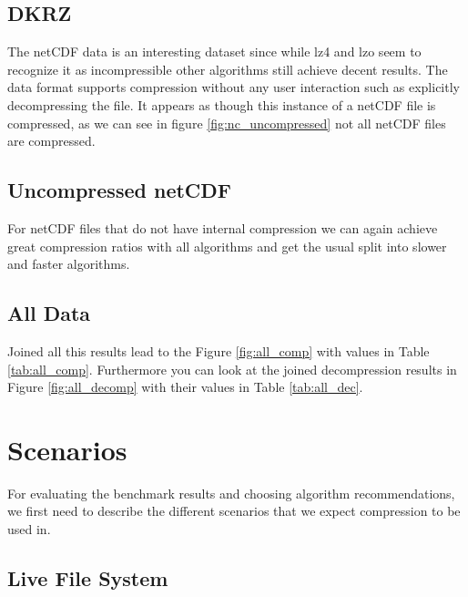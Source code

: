 \documentclass[
	12pt,
	a4paper,
	BCOR10mm,
	DIV14,
	listof=totoc,
	bibliography=totoc,
	headsepline
]{scrreprt}
\begin{document}
\FloatBarrier
\subsection{DKRZ}


The netCDF data is an interesting dataset since while lz4 and lzo seem to recognize it as incompressible other algorithms still achieve decent results.
The data format supports compression without any user interaction such as explicitly decompressing the file. It appears as though this instance of a netCDF file is compressed, as we can see in figure \ref{fig:nc_uncompressed} not all netCDF files are compressed.





\FloatBarrier
\subsection{Uncompressed netCDF}
\FloatBarrier


For netCDF files that do not have internal compression we can again achieve great compression ratios with all algorithms and get the usual split into slower and faster algorithms.





\FloatBarrier
\subsection{All Data}
\FloatBarrier


Joined all this results lead to the Figure \ref{fig:all_comp} with values in Table \ref{tab:all_comp}.
Furthermore you can look at the joined decompression results in Figure \ref{fig:all_decomp} with their values in Table \ref{tab:all_dec}.
\FloatBarrier

\section{Scenarios}
\label{Scenarios}

For evaluating the benchmark results and choosing algorithm recommendations, we first need to describe the different scenarios that we expect compression to be used in.

\subsection{Live File System}
\end{document}
